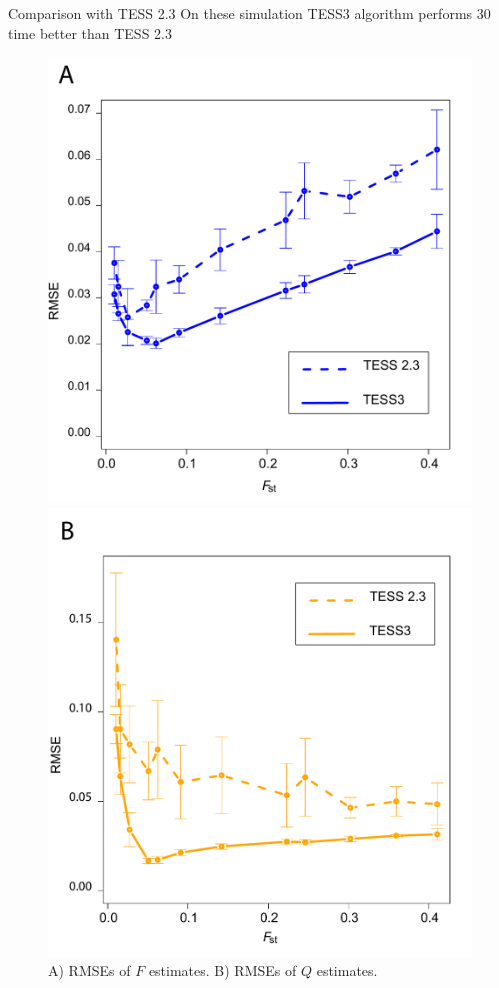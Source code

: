 \documentclass{beamer}\usepackage[]{graphicx}\usepackage[]{color}
\begin{document}
\begin{frame}{Comparison with TESS 2.3 }
On these simulation TESS3 algorithm performs 30 time better than TESS 2.3

\begin{figure}[h!]\centering
\begin{minipage}{0.49\textwidth}
\includegraphics[width=\linewidth]{rmseG.pdf}
\end{minipage}
\begin {minipage}{0.49\textwidth}
\includegraphics[width=\linewidth]{rmseQ.pdf}
\end{minipage}
\caption{A) RMSEs of $F$ estimates. B) RMSEs of $Q$ estimates.}
\end{figure}


\end{frame}
\end{document}
